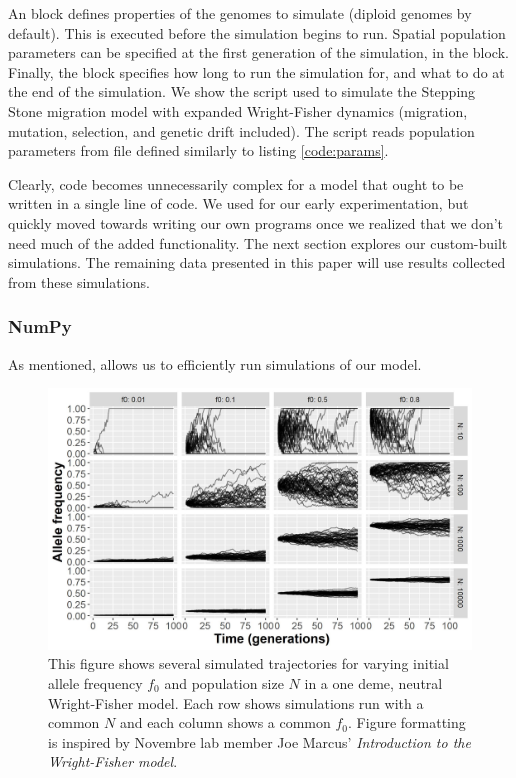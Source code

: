 

An  block defines properties of the genomes to simulate (diploid genomes by default). This is executed before the simulation begins to run. Spatial population parameters can be specified at the first generation of the simulation, in the  block. Finally, the  block specifies how long to run the simulation for, and what to do at the end of the simulation. We show the script used to simulate the Stepping Stone migration model with expanded Wright-Fisher dynamics (migration, mutation, selection, and genetic drift included). The script reads population parameters from  file defined similarly to listing \ref{code:params}. 




Clearly,  code becomes unnecessarily complex for a model that ought to be written in a single line of code. We used  for our early experimentation, but quickly moved towards writing our own programs once we realized that we don't need much of the added  functionality. The next section explores our custom-built simulations. The remaining data presented in this paper will use results collected from these  simulations.

\subsubsection{NumPy}

As mentioned,  allows us to efficiently run simulations of our model. 


\begin{figure}[h]
    \centering
    \includegraphics[scale=0.8]{img/neutral_wf.jpg}
    \caption{This figure shows several simulated trajectories for varying initial allele frequency $f_0$ and population size $N$ in a one deme, neutral Wright-Fisher model. Each row shows simulations run with a common $N$ and each column shows a common $f_0$. Figure formatting is inspired by Novembre lab member Joe Marcus' \textit{Introduction to the Wright-Fisher model}.\cite{marcus_2016}}
    \label{fig:neutral_wf}
\end{figure}



